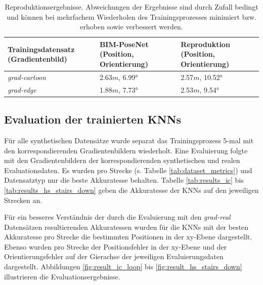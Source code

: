 \begin{table}[b]
	\centering
	\caption{Reproduktionsergebnisse. Abweichungen der Ergebnisse sind durch Zufall bedingt und können bei mehrfachem Wiederholen des Trainingsprozesses minimiert bzw. erhoben sowie verbessert werden. }
	\begin{tabularx}{1.0\textwidth}{X X X}
		\textbf{Trainingsdatensatz} \hspace{2cm} (Gradientenbild) & \textbf{BIM-PoseNet} \hspace{2cm} (Position, Orientierung) & \textbf{Reproduktion} \hspace{2cm} (Position, Orientierung)\\
		\hline
	 \textit{grad-cartoon} & 2.63$m$, 6.99° & 2.57$m$, 10.52°\\
		\hline
		\textit{grad-edge} & 1.88$m$, 7.73°  & 2.53$m$, 9.54°\\
	\end{tabularx}
	\label{tab:reproduction}
\end{table}





\subsection{Evaluation der trainierten KNNs}
Für alle synthetischen Datensätze wurde separat das Trainingsprozess 5-mal mit den korrespondierenden Gradientenbildern wiederholt. Eine Evaluierung folgte mit den Gradientenbildern der korrespondierenden synthetischen und realen Evaluationsdaten. Es wurden pro Strecke (s. Tabelle \ref{tab:dataset_metrics}) und Datensatztyp nur die beste Akkuratesse behalten. Tabelle \ref{tab:results_ic} bis \ref{tab:results_hs_stairs_down} geben die Akkuratesse der KNNs auf den jeweiligen Strecken an. 

Für ein besseres Verständnis der durch die Evaluierung mit den \textit{grad-real} Datensätzen resultierenden Akkuratessen wurden für die KNNs mit der besten Akkuratesse pro Strecke die bestimmten Positionen in der xy-Ebene dargestellt. Ebenso wurden pro Strecke der Positionsfehler in der xy-Ebene und der Orientierungsfehler auf der Gierachse der jeweiligen Evaluierungsdaten dargestellt. Abbildungen \ref{fig:result_ic_loop} bis \ref{fig:result_hs_stairs_down} illustrieren die Evaluationsergebnisse.


